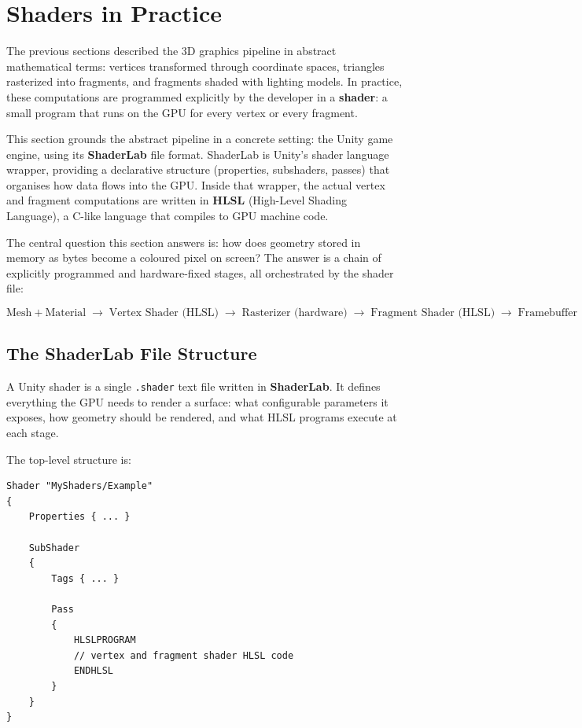 \documentclass[11pt]{article}
\begin{document}
\section{Shaders in Practice}

The previous sections described the 3D graphics pipeline in abstract mathematical terms: vertices transformed through coordinate spaces, triangles rasterized into fragments, and fragments shaded with lighting models. In practice, these computations are programmed explicitly by the developer in a \textbf{shader}: a small program that runs on the GPU for every vertex or every fragment.

This section grounds the abstract pipeline in a concrete setting: the Unity game engine, using its \textbf{ShaderLab} file format. ShaderLab is Unity's shader language wrapper, providing a declarative structure (properties, subshaders, passes) that organises how data flows into the GPU. Inside that wrapper, the actual vertex and fragment computations are written in \textbf{HLSL} (High-Level Shading Language), a C-like language that compiles to GPU machine code.

The central question this section answers is: how does geometry stored in memory as bytes become a coloured pixel on screen? The answer is a chain of explicitly programmed and hardware-fixed stages, all orchestrated by the shader file:

\begin{equation}
    \text{Mesh} + \text{Material}
    \;\rightarrow\;
    \text{Vertex Shader (HLSL)}
    \;\rightarrow\;
    \text{Rasterizer (hardware)}
    \;\rightarrow\;
    \text{Fragment Shader (HLSL)}
    \;\rightarrow\;
    \text{Framebuffer}
\end{equation}


\subsection{The ShaderLab File Structure}

A Unity shader is a single \texttt{.shader} text file written in \textbf{ShaderLab}. It defines everything the GPU needs to render a surface: what configurable parameters it exposes, how geometry should be rendered, and what HLSL programs execute at each stage.

The top-level structure is:

\begin{lstlisting}
Shader "MyShaders/Example"
{
    Properties { ... }

    SubShader
    {
        Tags { ... }

        Pass
        {
            HLSLPROGRAM
            // vertex and fragment shader HLSL code
            ENDHLSL
        }
    }
}
\end{lstlisting}
\end{document}

